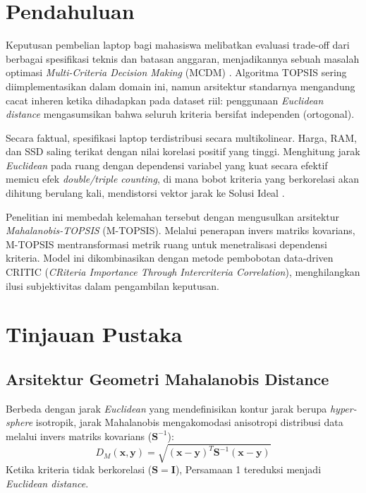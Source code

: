 \documentclass[10pt, a4paper, twocolumn]{article}
\begin{document}
\section{Pendahuluan}

Keputusan pembelian laptop bagi mahasiswa melibatkan evaluasi trade-off dari berbagai spesifikasi teknis dan batasan anggaran, menjadikannya sebuah masalah optimasi \textit{Multi-Criteria Decision Making} (MCDM) \cite{turban2005}. Algoritma TOPSIS \cite{hwang1981} sering diimplementasikan dalam domain ini, namun arsitektur standarnya mengandung cacat inheren ketika dihadapkan pada dataset riil: penggunaan \textit{Euclidean distance} mengasumsikan bahwa seluruh kriteria bersifat independen (ortogonal). 

Secara faktual, spesifikasi laptop terdistribusi secara multikolinear. Harga, RAM, dan SSD saling terikat dengan nilai korelasi positif yang tinggi. Menghitung jarak \textit{Euclidean} pada ruang dengan dependensi variabel yang kuat secara efektif memicu efek \textit{double/triple counting}, di mana bobot kriteria yang berkorelasi akan dihitung berulang kali, mendistorsi vektor jarak ke Solusi Ideal \cite{yoon1995}.

Penelitian ini membedah kelemahan tersebut dengan mengusulkan arsitektur \textit{Mahalanobis-TOPSIS} (M-TOPSIS). Melalui penerapan invers matriks kovarians, M-TOPSIS mentransformasi metrik ruang untuk menetralisasi dependensi kriteria. Model ini dikombinasikan dengan metode pembobotan data-driven CRITIC (\textit{CRiteria Importance Through Intercriteria Correlation}), menghilangkan ilusi subjektivitas dalam pengambilan keputusan.

\section{Tinjauan Pustaka}

\subsection{Arsitektur Geometri Mahalanobis Distance}

Berbeda dengan jarak \textit{Euclidean} yang mendefinisikan kontur jarak berupa \textit{hyper-sphere} isotropik, jarak Mahalanobis \cite{mahal1936} mengakomodasi anisotropi distribusi data melalui invers matriks kovarians ($\mathbf{S}^{-1}$):
\begin{equation}
D_M(\mathbf{x}, \mathbf{y}) = \sqrt{(\mathbf{x} - \mathbf{y})^T \mathbf{S}^{-1} (\mathbf{x} - \mathbf{y})}
\end{equation}
Ketika kriteria tidak berkorelasi ($\mathbf{S} = \mathbf{I}$), Persamaan 1 tereduksi menjadi \textit{Euclidean distance}.
\end{document}
